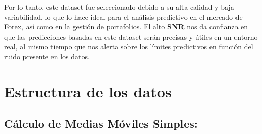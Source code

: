 \documentclass[
]{book}
\newenvironment{Shaded}{\begin{snugshade}}{\end{snugshade}}
\newcommand{\AttributeTok}[1]{\textcolor[rgb]{0.13,0.29,0.53}{#1}}
\newcommand{\CommentTok}[1]{\textcolor[rgb]{0.56,0.35,0.01}{\textit{#1}}}
\newcommand{\DecValTok}[1]{\textcolor[rgb]{0.00,0.00,0.81}{#1}}
\newcommand{\FunctionTok}[1]{\textcolor[rgb]{0.13,0.29,0.53}{\textbf{#1}}}
\newcommand{\NormalTok}[1]{#1}
\newcommand{\OtherTok}[1]{\textcolor[rgb]{0.56,0.35,0.01}{#1}}
\newcommand{\SpecialCharTok}[1]{\textcolor[rgb]{0.81,0.36,0.00}{\textbf{#1}}}
\begin{document}
Por lo tanto, este dataset fue seleccionado debido a su alta calidad y baja variabilidad, lo que lo hace ideal para el análisis predictivo en el mercado de Forex, así como en la gestión de portafolios. El alto \textbf{SNR} nos da confianza en que las predicciones basadas en este dataset serán precisas y útiles en un entorno real, al mismo tiempo que nos alerta sobre los límites predictivos en función del ruido presente en los datos.

\chapter{Estructura de los datos}\label{intro}

\section{Cálculo de Medias Móviles Simples:}\label{cuxe1lculo-de-medias-muxf3viles-simples}

\begin{Shaded}
\end{Shaded}
\end{document}
